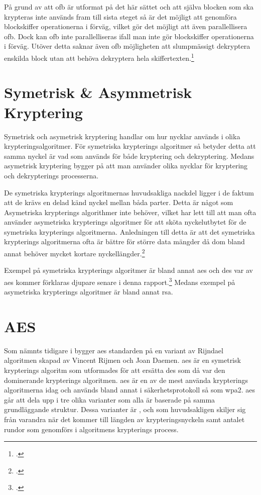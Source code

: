 På grund av att \acrshort{ofb} är utformat på det här sättet och att själva blocken som
ska krypteras inte används fram till sista steget så är det möjligt att genomföra blockskiffer
operationerna i förväg, vilket gör det möjligt att även parallellisera \acrshort{ofb}. Dock
kan \acrshort{ofb} inte parallelliseras ifall man inte gör blockskiffer operationerna
i förväg. Utöver detta saknar även \acrshort{ofb} möjligheten att slumpmässigt dekryptera
enskilda block utan att behöva dekryptera hela skiffertexten.\footcite{dworkin2001sp}

\section{Symetrisk \& Asymmetrisk Kryptering}
\label{sec:symmetric-asymmetric-encryption}
Symetrisk och asymetrisk kryptering handlar om hur nycklar används i olika
krypteringsalgoritmer. För symetriska krypterings algoritmer så betyder detta
att samma nyckel är vad som används för både kryptering och dekryptering. Medans
asymetrisk kryptering bygger på att man använder olika nycklar för kryptering och
dekrypterings processerna.

De symetriska krypterings algoritmernas huvudsakliga nackdel ligger i de faktum att
de krävs en delad känd nyckel mellan båda parter. Detta är något som Asymetriska
krypterings algorithmer inte behöver, vilket har lett till att man ofta använder
asymetriska krypterings algoritmer för att sköta nyckelutbytet för de symetriska
krypterings algoritmerna. Anledningen till detta är att det symetriska krypterings
algoritmerna ofta är bättre för större data mängder då dom bland annat behöver mycket
kortare nyckellängder.\footcite{symencrypt}

Exempel på symetriska krypterings algoritmer är bland annat \acrshort{aes} och
\acrshort{des} var av \acrshort{aes} kommer förklaras djupare senare i denna rapport.\footcite{symencrypt}
Medans exempel på asymetriska krypterings algoritmer är bland annat \gls{rsa}.

\section{AES}
\label{sec:aes}

Som nämnts tidigare i  bygger \acrshort{aes} standarden på en variant av Rijndael  algoritmen
skapad av Vincent Rijmen och Joan Daemen. \acrshort{aes} är en symetrisk  krypterings algoritm som utformades för att ersätta
\acrshort{des} som då var den dominerande krypterings algoritmen. \acrshort{aes} är en av de mest använda krypterings algoritmerna idag
och används bland annat i säkerhetsprotokoll så som \acrfull{wpa2}. \acrshort{aes} går att dela upp i tre olika varianter
som alla är baserade på samma grundläggande struktur. Dessa varianter är ,  och  som huvudsakligen
skiljer sig från varandra när det kommer till längden av krypteringsnyckeln samt antalet rundor som genomförs i algoritmens krypterings process.

